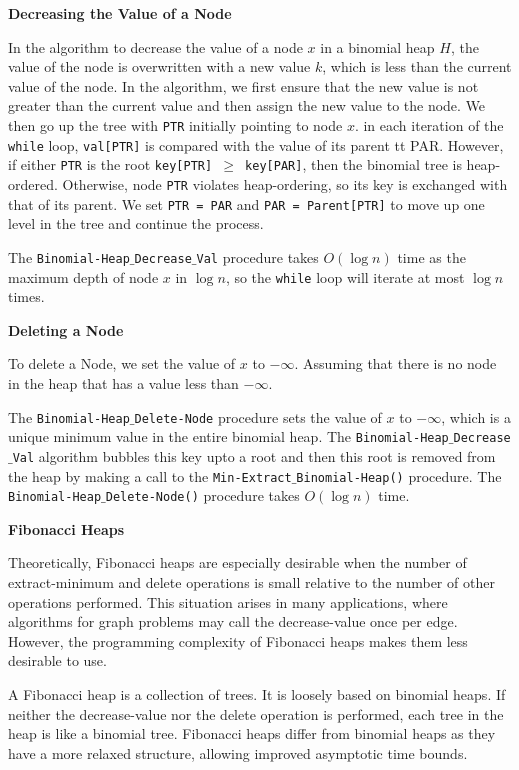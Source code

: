 \filbreak
\vskip 3mm
{\bf Decreasing the Value of a Node}

\vskip 1mm
In the algorithm to decrease the value of a node $x$ in a binomial heap $H$, the value of the node is overwritten with a new value $k$, which is less than the current value of the node.
\vskip 1mm
In the algorithm, we first ensure that the new value is not greater than the current value and then assign the new value to the node. We then go up the tree with {\tt PTR} initially pointing to node $x$. in each iteration of the {\tt while} loop, {\tt val[PTR]} is compared with the value of its parent {tt PAR}. However, if either {\tt PTR} is the root {\tt key[PTR] $\geq$ key[PAR]}, then the binomial tree is heap-ordered. Otherwise, node {\tt PTR} violates heap-ordering, so its key is exchanged with that of its parent. We set {\tt PTR = PAR} and {\tt PAR = Parent[PTR]} to move up one level in the tree and continue the process.

\vskip 1mm
The {\tt Binomial-Heap$\_$Decrease$\_$Val} procedure takes $O(\log n)$ time as the maximum depth of node $x$ in $\log n$, so the {\tt while} loop will iterate at most $\log n$ times.

\vskip 3mm
{\bf Deleting a Node}

\vskip 1mm
To delete a Node, we set the value of $x$ to $-\infty$. Assuming that there is no node in the heap that has a value less than $-\infty$.

\vskip 1mm
The {\tt Binomial-Heap$\_$Delete-Node} procedure sets the value of $x$ to $-\infty$, which is a unique minimum value in the entire binomial heap. The {\tt Binomial-Heap$\_$Decrease$\_$Val} algorithm bubbles this key upto a root and then this root is removed from the heap by making a call to the {\tt Min-Extract$\_$Binomial-Heap()} procedure. The {\tt Binomial-Heap$\_$Delete-Node()} procedure takes $O(\log n)$ time.

\filbreak
\vskip 1cm
{\bf Fibonacci Heaps}

\vskip 1mm
Theoretically, Fibonacci heaps are especially desirable when the number of extract-minimum and delete operations is small relative to the number of other operations performed. This situation arises in many applications, where algorithms for graph problems may call the decrease-value once per edge. However, the programming complexity of Fibonacci heaps makes them less desirable to use.

\vskip 1mm
A Fibonacci heap is a collection of trees. It is loosely based on binomial heaps. If neither the decrease-value nor the delete operation is performed, each tree in the heap is like a binomial tree. Fibonacci heaps differ from binomial heaps as they have a more relaxed structure, allowing improved asymptotic time bounds.

